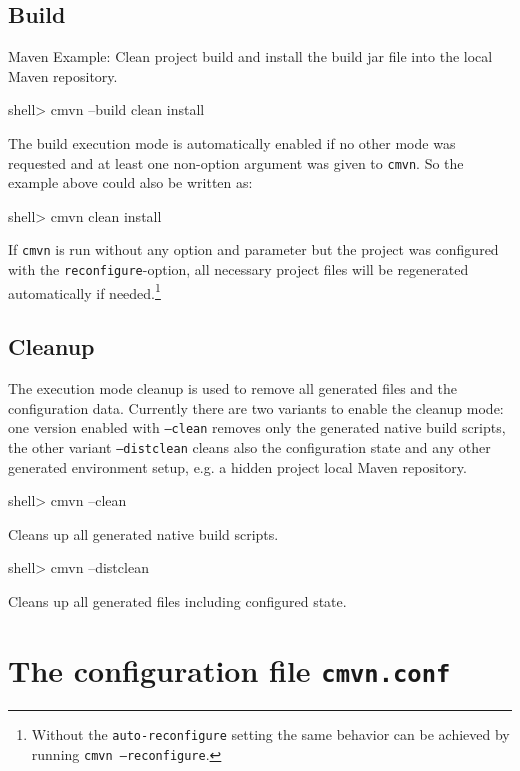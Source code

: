 \documentclass[a4paper,12pt,english,oneside,halfparskip]{scrartcl}
\newcommand{\CMVN}{\texttt{cmvn}}
\newcommand{\cmvn}{\texttt{cmvn}}
\newcommand{\code}[1]{\texttt{#1}}
\begin{document}
\subsection{Build}

Maven Example: Clean project build and install the build jar file into the local Maven repository.

\begin{Cmdline}
shell> cmvn --build clean install
\end{Cmdline}

The build execution mode is automatically enabled if no other mode was requested and at least one non-option argument was given to \CMVN{}. So the example above could also be written as:

\begin{Cmdline}
shell> cmvn clean install
\end{Cmdline}

If \cmvn{} is run without any option and parameter but the project was configured with the \code{reconfigure}-option, all necessary project files will be regenerated automatically if needed.\footnote{Without the \code{auto-reconfigure} setting the same behavior can be achieved by running \code{cmvn --reconfigure}.}



\subsection{Cleanup}

The execution mode cleanup is used to remove all generated files and the configuration data. Currently there are two variants to enable the cleanup mode: one version enabled with \code{--clean} removes only the generated native build scripts, the other variant \code{--distclean} cleans also the configuration state and any other generated environment setup, e.g. a hidden project local Maven repository.

\begin{Cmdline}
shell> cmvn --clean
\end{Cmdline}

Cleans up all generated native build scripts.

\begin{Cmdline}
shell> cmvn --distclean
\end{Cmdline}

Cleans up all generated files including configured state.

\section{The configuration file \texttt{cmvn.conf}}
\end{document}
